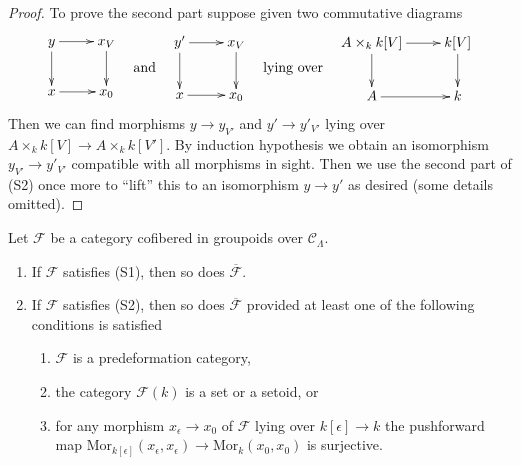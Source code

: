 \begin{proof}
\medskip\noindent
To prove the second part suppose given two commutative
diagrams
$$
\vcenter{
\xymatrix{
y \ar[r] \ar[d] & x_V \ar[d] \\
x \ar[r] & x_0
}
}
\quad\text{and}\quad
\vcenter{
\xymatrix{
y' \ar[r] \ar[d] & x_V \ar[d] \\
x \ar[r] & x_0
}
}
\quad\text{lying over}\quad
\vcenter{
\xymatrix{
A \times_k k[V] \ar[d] \ar[r] & k[V] \ar[d] \\
A \ar[r] & k
}
}
$$
Then we can find morphisms $y \to y_{V'}$ and $y' \to y'_{V'}$
lying over $A \times_k k[V] \to A \times_k k[V']$. By induction hypothesis
we obtain an isomorphism $y_{V'} \to y'_{V'}$ compatible with all
morphisms in sight. Then we use the second part of (S2) once more
to ``lift'' this to an isomorphism $y \to y'$ as desired (some details
omitted).
\end{proof}

\begin{lemma}
\label{lemma-S1-S2-associated-functor}
Let $\mathcal{F}$ be a category cofibered in groupoids over
$\mathcal{C}_\Lambda$. 
\begin{enumerate}
\item If $\mathcal{F}$ satisfies (S1), then so does 
$\overline{\mathcal{F}}$. 
\item If $\mathcal{F}$ satisfies (S2), then so does 
$\overline{\mathcal{F}}$ provided at least one of the following conditions is
satisfied
\begin{enumerate}
\item $\mathcal{F}$ is a predeformation category,
\item the category $\mathcal{F}(k)$ is a set or a setoid, or
\item for any morphism $x_\epsilon \to x_0$ of $\mathcal{F}$
lying over $k[\epsilon] \to k$ the pushforward map
$\text{Mor}_{k[\epsilon]}(x_\epsilon, x_\epsilon)
\to \text{Mor}_k(x_0, x_0)$
is surjective.
\end{enumerate}
\end{enumerate}
\end{lemma}

